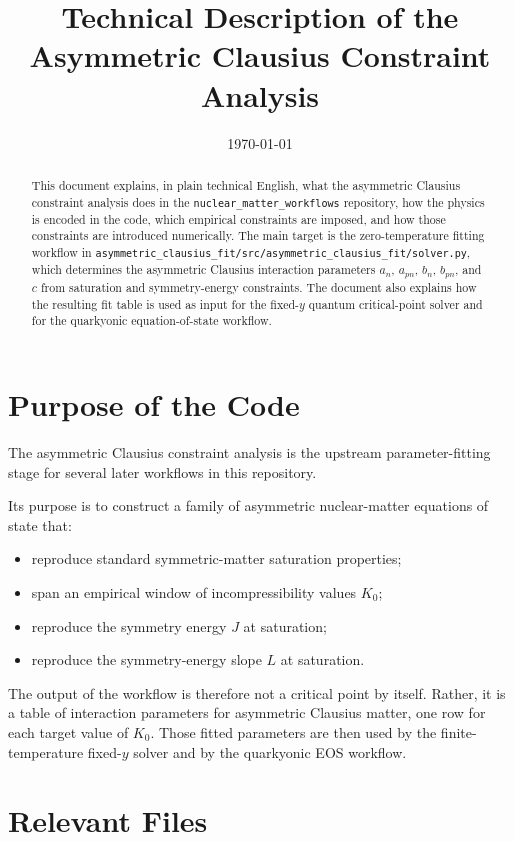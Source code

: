 \documentclass[11pt]{article}
\title{Technical Description of the Asymmetric Clausius Constraint Analysis}
\author{}
\date{\today}
\begin{document}
\maketitle

\begin{abstract}
This document explains, in plain technical English, what the asymmetric
Clausius constraint analysis does in the
\texttt{nuclear\_matter\_workflows} repository, how the physics is encoded in
the code, which empirical constraints are imposed, and how those constraints
are introduced numerically. The main target is the zero-temperature fitting
workflow in
\texttt{asymmetric\_clausius\_fit/src/asymmetric\_clausius\_fit/solver.py},
which determines the asymmetric Clausius interaction parameters
$a_n$, $a_{pn}$, $b_n$, $b_{pn}$, and $c$ from saturation and symmetry-energy
constraints. The document also explains how the resulting fit table is used as
input for the fixed-$y$ quantum critical-point solver and for the quarkyonic
equation-of-state workflow.
\end{abstract}

\section{Purpose of the Code}

The asymmetric Clausius constraint analysis is the upstream parameter-fitting
stage for several later workflows in this repository.

Its purpose is to construct a family of asymmetric nuclear-matter equations of
state that:
\begin{itemize}
\item reproduce standard symmetric-matter saturation properties;
\item span an empirical window of incompressibility values $K_0$;
\item reproduce the symmetry energy $J$ at saturation;
\item reproduce the symmetry-energy slope $L$ at saturation.
\end{itemize}

The output of the workflow is therefore not a critical point by itself. Rather,
it is a table of interaction parameters for asymmetric Clausius matter, one row
for each target value of $K_0$. Those fitted parameters are then used by the
finite-temperature fixed-$y$ solver and by the quarkyonic EOS workflow.

\section{Relevant Files}
\end{document}
